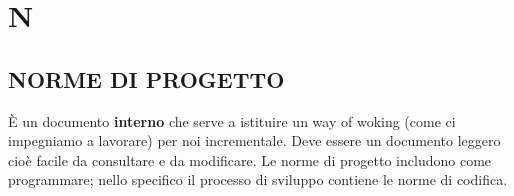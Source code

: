 \newpage
	\section{N} \label{sec:N}
	
		\subsection{NORME DI PROGETTO}	 \label{norme}
		È un documento \textbf{interno} che serve a istituire un way of woking (come ci impegniamo a lavorare) per noi incrementale. Deve essere un documento leggero cioè facile da consultare e da modificare.
		Le norme di progetto includono come programmare; nello specifico il processo di sviluppo contiene le norme di codifica.
		
		
